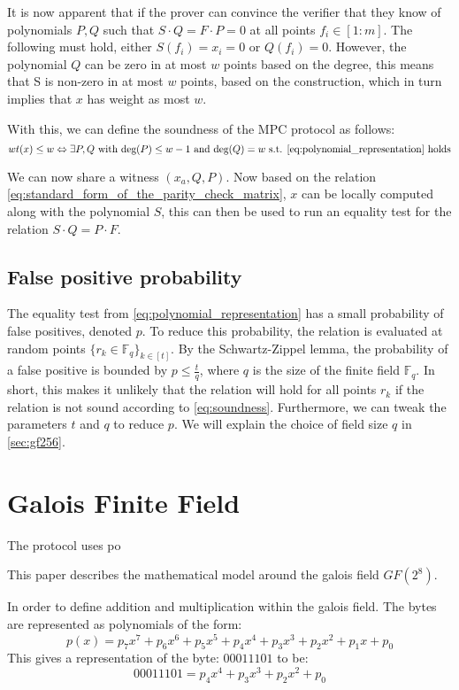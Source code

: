 \documentclass[twoside,11pt,openright]{report}
\theoremstyle{definition}
\theoremstyle{plain}
\begin{document}
It is now apparent that if the prover can convince the verifier that they know of polynomials $P,Q$ such that $S\cdot Q = F \cdot P = 0$ at all points $f_i \in [1:m]$. The following must hold, either $S(f_i) = x_i = 0$ or $Q(f_i) = 0$. However, the polynomial $Q$ can be zero in at most $w$ points based on the degree, this means that S is non-zero in at most $w$ points, based on the construction, which in turn implies that $x$ has weight as most $w$.

With this, we can define the soundness of the MPC protocol as follows:
\begin{equation}
  wt(x) \leq w \Leftrightarrow \exists P,Q \text{  with  }\text{deg}(P)\leq w-1\text{  and  }\text{deg}(Q) = w\text{ s.t. \autoref{eq:polynomial_representation} holds}
  \label{eq:soundness}
\end{equation}

We can now share a witness $(x_a, Q, P)$. Now based on the relation \autoref{eq:standard_form_of_the_parity_check_matrix}, $x$ can be locally computed along with the polynomial $S$, this can then be used to run an equality test for the relation $S \cdot Q = P \cdot F$.

\subsection{False positive probability}\label{sub:equality_test}
The equality test from \autoref{eq:polynomial_representation} has a small probability of false positives, denoted $p$. To reduce this probability, the relation is evaluated at random points $\{r_k \in \mathbb{F}_q\}_{k\in[t]}$. By the Schwartz-Zippel lemma, the probability of a false positive is bounded by $p \leq \frac{t}{q}$, where $q$ is the size of the finite field $\mathbb{F}_q$. In short, this makes it unlikely that the relation will hold for all points $r_k$ if the relation is not sound according to \autoref{eq:soundness}. Furthermore, we can tweak the parameters $t$ and $q$ to reduce $p$. We will explain the choice of field size $q$ in \autoref{sec:gf256}.

\section{Galois Finite Field}
\label{sec:gf256}
The protocol uses po

This paper \cite{brownadvanced} describes the mathematical model around the galois field $GF(2^8)$.

In order to define addition and multiplication within the galois field. The bytes are represented as polynomials of the form:
\begin{equation}
  \label{eq:poly}
  p(x) = p_7x^7 + p_6x^6 + p_5x^5 + p_4x^4 + p_3x^3 + p_2x^2 + p_1x + p_0
\end{equation}
This gives a representation of the byte: ${00011101}$ to be:
\begin{equation}
  \label{eq:example_poly}
  00011101 = p_4x^4 + p_3x^3 + p_2x^2 + p_0
\end{equation}
\end{document}
